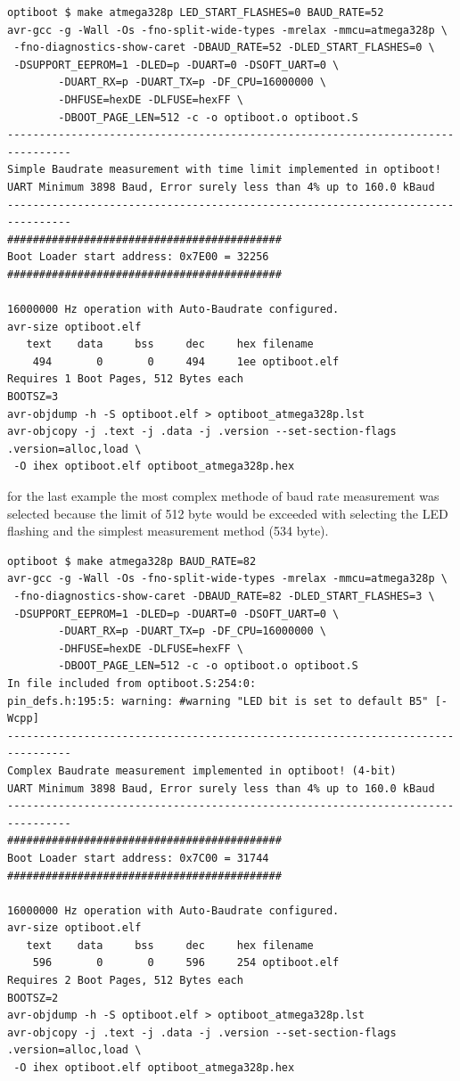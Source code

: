\begin{verbatim}
optiboot $ make atmega328p LED_START_FLASHES=0 BAUD_RATE=52
avr-gcc -g -Wall -Os -fno-split-wide-types -mrelax -mmcu=atmega328p \
 -fno-diagnostics-show-caret -DBAUD_RATE=52 -DLED_START_FLASHES=0 \
 -DSUPPORT_EEPROM=1 -DLED=p -DUART=0 -DSOFT_UART=0 \
        -DUART_RX=p -DUART_TX=p -DF_CPU=16000000 \
        -DHFUSE=hexDE -DLFUSE=hexFF \
        -DBOOT_PAGE_LEN=512 -c -o optiboot.o optiboot.S
--------------------------------------------------------------------------------
Simple Baudrate measurement with time limit implemented in optiboot!
UART Minimum 3898 Baud, Error surely less than 4% up to 160.0 kBaud
--------------------------------------------------------------------------------
###########################################
Boot Loader start address: 0x7E00 = 32256
###########################################

16000000 Hz operation with Auto-Baudrate configured.
avr-size optiboot.elf
   text	   data	    bss	    dec	    hex	filename
    494	      0	      0	    494	    1ee	optiboot.elf
Requires 1 Boot Pages, 512 Bytes each
BOOTSZ=3
avr-objdump -h -S optiboot.elf > optiboot_atmega328p.lst
avr-objcopy -j .text -j .data -j .version --set-section-flags .version=alloc,load \
 -O ihex optiboot.elf optiboot_atmega328p.hex
\end{verbatim}


for the last example the most complex methode of baud rate measurement
was selected because the limit of 512 byte would be exceeded with
selecting the LED flashing and the simplest measurement method (534 byte).

\begin{verbatim}
optiboot $ make atmega328p BAUD_RATE=82
avr-gcc -g -Wall -Os -fno-split-wide-types -mrelax -mmcu=atmega328p \
 -fno-diagnostics-show-caret -DBAUD_RATE=82 -DLED_START_FLASHES=3 \
 -DSUPPORT_EEPROM=1 -DLED=p -DUART=0 -DSOFT_UART=0 \
        -DUART_RX=p -DUART_TX=p -DF_CPU=16000000 \
        -DHFUSE=hexDE -DLFUSE=hexFF \
        -DBOOT_PAGE_LEN=512 -c -o optiboot.o optiboot.S
In file included from optiboot.S:254:0:
pin_defs.h:195:5: warning: #warning "LED bit is set to default B5" [-Wcpp]
--------------------------------------------------------------------------------
Complex Baudrate measurement implemented in optiboot! (4-bit)
UART Minimum 3898 Baud, Error surely less than 4% up to 160.0 kBaud
--------------------------------------------------------------------------------
###########################################
Boot Loader start address: 0x7C00 = 31744
###########################################

16000000 Hz operation with Auto-Baudrate configured.
avr-size optiboot.elf
   text	   data	    bss	    dec	    hex	filename
    596	      0	      0	    596	    254	optiboot.elf
Requires 2 Boot Pages, 512 Bytes each
BOOTSZ=2
avr-objdump -h -S optiboot.elf > optiboot_atmega328p.lst
avr-objcopy -j .text -j .data -j .version --set-section-flags .version=alloc,load \
 -O ihex optiboot.elf optiboot_atmega328p.hex
\end{verbatim}


